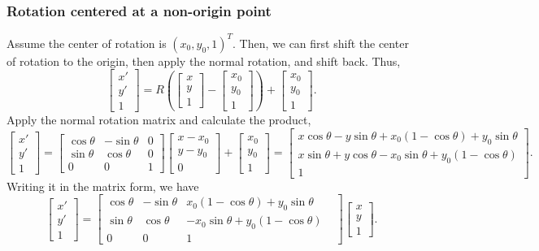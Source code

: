 \subsubsection{Rotation centered at a non-origin point}
Assume the center of rotation is \((x_0, y_0, 1)^T\).
Then, we can first shift the center of rotation to the origin, then apply the normal rotation, and shift back.
Thus,
\[ \begin{bmatrix}x'\\ y'\\ 1 \end{bmatrix}=R\left(\begin{bmatrix}x\\ y\\ 1 \end{bmatrix}-\begin{bmatrix}x_0\\ y_0\\ 1 \end{bmatrix}\right)+\begin{bmatrix}x_0\\ y_0\\ 1 \end{bmatrix}. \]
Apply the normal rotation matrix and calculate the product,
\[ \begin{bmatrix}x'\\ y'\\ 1 \end{bmatrix}=\begin{bmatrix} \cos\theta & -\sin\theta & 0 \\ \sin\theta & \cos\theta & 0 \\ 0 & 0 & 1 \end{bmatrix}\begin{bmatrix} x-x_0 \\ y-y_0 \\ 0 \end{bmatrix}+\begin{bmatrix}x_0\\ y_0\\ 1 \end{bmatrix}=\begin{bmatrix} x\cos\theta-y\sin\theta+x_0(1-\cos\theta)+y_0\sin\theta \\ x\sin\theta+y\cos\theta-x_0\sin\theta+y_0(1-\cos\theta) \\ 1 \end{bmatrix}. \]
Writing it in the matrix form, we have
\[ \begin{bmatrix}x'\\ y'\\ 1 \end{bmatrix}=\begin{bmatrix} \cos\theta & -\sin\theta & x_0(1-\cos\theta)+y_0\sin\theta &  \\ \sin\theta & \cos\theta & -x_0\sin\theta+y_0(1-\cos\theta) \\ 0 & 0 & 1 \end{bmatrix}\begin{bmatrix}x\\ y\\ 1 \end{bmatrix}. \]
